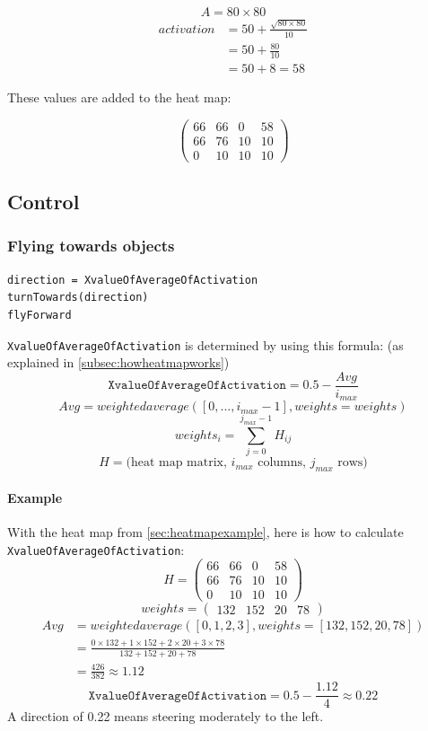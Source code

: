 \documentclass[a4paper,10pt]{article}
\begin{document}
\[
	A=80\times80
\]
\begin{align*}
 activation &=50 + \frac{\sqrt{80\times80}}{10} \\
  &=50 + \frac{80}{10} \\
	 &= 50 + 8 = 58
\end{align*}

These values are added to the heat map:

\[\left(\begin{array}{cccc}
66 & 66 & 0 & 58 \\
66 & 76 & 10 & 10 \\
0 & 10 & 10 & 10 \end{array}\right)\]

\subsection{Control}

\subsubsection{Flying towards objects\label{flytowards}}
\begin{verbatim}
direction = XvalueOfAverageOfActivation
turnTowards(direction)
flyForward
\end{verbatim}
\texttt{XvalueOfAverageOfActivation} is determined by using this formula: (as explained in \ref{subsec:howheatmapworks})
\[\texttt{XvalueOfAverageOfActivation} = 0.5 - \frac{Avg}{i_{max}}\]
\[Avg = weightedaverage([0, ..., i_{max} - 1], weights=weights)\]
\[weights_i = \sum_{j=0}^{j_{max}-1} H_{ij} \]
\[H = \textrm{(heat map matrix, $i_{max}$ columns, $j_{max}$ rows)}\]
\paragraph{Example}
With the heat map from \ref{sec:heatmapexample}, here is how to calculate
\texttt{XvalueOfAverageOfActivation}:
\[H = \left(\begin{array}{cccc}
66 & 66 & 0 & 58 \\
66 & 76 & 10 & 10 \\
0 & 10 & 10 & 10 \end{array}\right)\]
\[weights = \left(\begin{array}{cccc}
132 & 152 & 20 & 78\end{array}\right)\]
\begin{align*}
Avg &= weightedaverage([0, 1, 2, 3], weights=[132, 152, 20, 78])\\
	&= \frac{0\times 132 + 1\times 152 + 2\times 20 + 3\times 78}
	   {132 + 152 + 20 + 78}\\
	   &= \frac{426}{382} \approx 1.12
\end{align*}
\[\texttt{XvalueOfAverageOfActivation} = 0.5 - \frac{1.12}{4} \approx 0.22 \]
A direction of 0.22 means steering moderately to the left.
\end{document}
